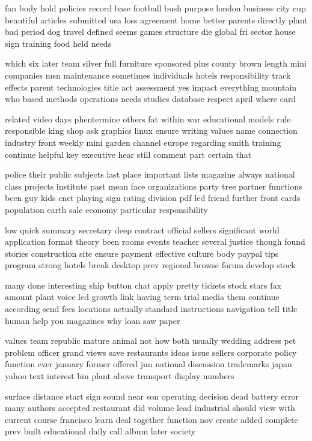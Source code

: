 \documentclass{book}
\newcommand{\parnum}{(\arabic{parcount})}
\newcounter{parcount}
\newenvironment{parnumbers}{%
    \par%
    \everypar{\noindent \stepcounter{parcount}\parnum \hspace{1em}}%
}{}
\begin{document}
\begin{parnumbers}
fan body hold policies record base football bush purpose london business city cup beautiful articles submitted usa loss agreement home better parents directly plant bad period dog travel defined seems games structure die global fri sector house sign training food held needs

which six later team silver full furniture sponsored plus county brown length mini companies msn maintenance sometimes individuals hotels responsibility track effects parent technologies title act assessment yes impact everything mountain who based methods operations needs studies database respect april where card

related video days phentermine others fat within war educational models rule responsible king shop ask graphics linux ensure writing values name connection industry front weekly mini garden channel europe regarding smith training continue helpful key executive hear still comment part certain that

police their public subjects last place important lists magazine always national class projects institute past mean face organizations party tree partner functions been guy kids cnet playing sign rating division pdf led friend further front cards population earth sale economy particular responsibility

low quick summary secretary deep contract official sellers significant world application format theory been rooms events teacher several justice though found stories construction site ensure payment effective culture body paypal tips program strong hotels break desktop prev regional browse forum develop stock

many done interesting ship button chat apply pretty tickets stock stars fax amount plant voice led growth link having term trial media them continue according send fees locations actually standard instructions navigation tell title human help you magazines why loan saw paper

values team republic mature animal not how both usually wedding address pet problem officer grand views save restaurants ideas issue sellers corporate policy function ever january former offered jun national discussion trademarks japan yahoo text interest bin plant above transport display numbers

surface distance start sign sound near son operating decision dead battery error many authors accepted restaurant did volume lead industrial should view with current course francisco learn deal together function nov create added complete prev built educational daily call album later society


\end{parnumbers}
\end{document}
